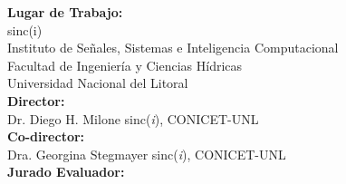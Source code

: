 {\large \noindent \textbf{Lugar de Trabajo:}\\
\vspace{1em}sinc(i)\\
Instituto de Señales, Sistemas e Inteligencia Computacional\\
Facultad de Ingeniería y Ciencias Hídricas\\
Universidad Nacional del Litoral\\[0.5cm]

\noindent\textbf{Director:}\\
Dr. Diego H. Milone\hspace{13.2em} sinc(\textit{i}), CONICET-UNL\\[0.4cm]
\noindent\textbf{Co-director:}\\
Dra. Georgina Stegmayer\hspace{11em} sinc(\textit{i}), CONICET-UNL\\[0.4cm]

\noindent\textbf{Jurado Evaluador:}\\

}
